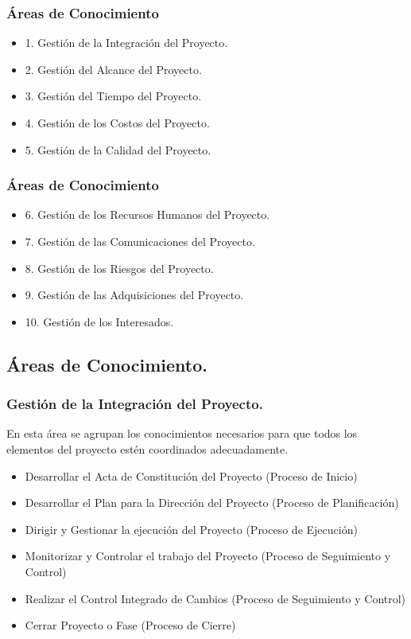 \documentclass[12pt]{beamer}
\begin{document}
\begin{frame}
 \frametitle{Áreas de Conocimiento}
 \begin{itemize}
  \item<2-> 1. Gestión de la Integración del Proyecto.
  \item<2-> 2. Gestión del Alcance del Proyecto.
  \item<3-> 3. Gestión del Tiempo del Proyecto.
  \item<4-> 4. Gestión de los Costos del Proyecto.
  \item<5-> 5. Gestión de la Calidad del Proyecto.
 \end{itemize}
\end{frame}


\begin{frame}
 \frametitle{Áreas de Conocimiento}
 \begin{itemize}  
  \item<1-> 6. Gestión de los Recursos Humanos del Proyecto.
  \item<2-> 7. Gestión de las Comunicaciones del Proyecto.
  \item<3-> 8. Gestión de los Riesgos del Proyecto.
  \item<4-> 9. Gestión de las Adquisiciones del Proyecto.
  \item<5-> 10. Gestión de los Interesados.
 \end{itemize}
\end{frame}

\subsection{Áreas de Conocimiento.}


\begin{frame}
 \frametitle{Gestión de la Integración del Proyecto.}
 En esta área se agrupan los conocimientos necesarios para que todos los elementos del proyecto estén coordinados adecuadamente.
 \begin{itemize}
  \item<2-> Desarrollar el Acta de Constitución del Proyecto (Proceso de Inicio)
  \item<3-> Desarrollar el Plan para la Dirección del Proyecto (Proceso de Planificación)
  \item<4-> Dirigir y Gestionar la ejecución del Proyecto (Proceso de Ejecución)
  \item<5-> Monitorizar y Controlar el trabajo del Proyecto (Proceso de Seguimiento y Control)
  \item<6-> Realizar el Control Integrado de Cambios (Proceso de Seguimiento y Control)
  \item<7-> Cerrar Proyecto o Fase (Proceso de Cierre)
 \end{itemize}
\end{frame}
\end{document}
